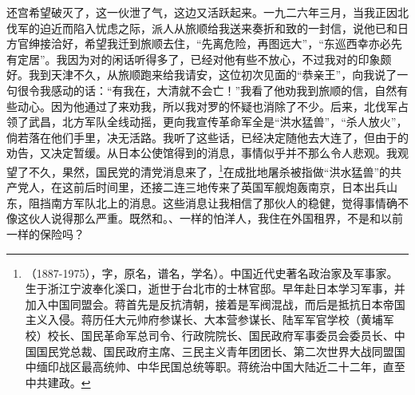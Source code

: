 还宫希望破灭了，这一伙泄了气，这边又活跃起来。一九二六年三月，当我正因北伐军的迫近而陷入忧虑之际，派人从旅顺给我送来奏折和致的一封信，说他已和日方官绅接洽好，希望我迁到旅顺去住，“先离危险，再图远大”，“东巡西幸亦必先有定居”。我因为对的闲话听得多了，已经对他有些不放心，不过我对的印象颇好。我到天津不久，从旅顺跑来给我请安，这位初次见面的“恭亲王”，向我说了一句很令我感动的话：“有我在，大清就不会亡！”我看了他劝我到旅顺的信，自然有些动心。因为他通过了来劝我，所以我对罗的怀疑也消除了不少。后来，北伐军占领了武昌，北方军队全线动摇，更向我宣传革命军全是“洪水猛兽”，“杀人放火”，倘若落在他们手里，决无活路。我听了这些话，已经决定随他去大连了，但由于的劝告，又决定暂缓。从日本公使馆得到的消息，事情似乎并不那么令人悲观。我观望了不久，果然，国民党的清党消息来了，\footnote{（1887-1975），字，原名，谱名，学名）。中国近代史著名政治家及军事家。生于浙江宁波奉化溪口，逝世于台北市的士林官邸。早年赴日本学习军事，并加入中国同盟会。蒋首先是反抗清朝，接着是军阀混战，而后是抵抗日本帝国主义入侵。蒋历任大元帅府参谋长、大本营参谋长、陆军军官学校（黄埔军校）校长、国民革命军总司令、行政院院长、国民政府军事委员会委员长、中国国民党总裁、国民政府主席、三民主义青年团团长、第二次世界大战同盟国中缅印战区最高统帅、中华民国总统等职。蒋统治中国大陆近二十二年，直至中共建政。}在成批地屠杀被指做“洪水猛兽”的共产党人，在这前后时间里，还接二连三地传来了英国军舰炮轰南京，日本出兵山东，阻挡南方军队北上的消息。这些消息让我相信了那伙人的稳健，觉得事情确不像这伙人说得那么严重。既然和。、一样的怕洋人，我住在外国租界，不是和以前一样的保险吗？\\

